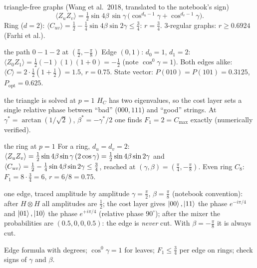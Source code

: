 \documentclass[11pt,a4paper,openany]{book}
\newcounter{wex}[chapter]
\begin{document}
\begin{keyres}{triangle-free graphs (Wang et al.\ 2018, translated to the notebook's sign)}
\[ \langle Z_uZ_v\rangle = \tfrac12\sin4\beta\,\sin\gamma\,\big(\cos^{d_u-1}\gamma + \cos^{d_v-1}\gamma\big). \]
Ring ($d = 2$): $\langle C_{uv}\rangle = \frac12 - \frac14\sin4\beta\sin2\gamma \le \frac34$: $r = \frac34$. 3-regular graphs: $r \ge 0.6924$ (Farhi et al.).
\end{keyres}
\begin{wexample}{the path $0{-}1{-}2$ at $(\frac\pi2, -\frac\pi8)$}
Edge $(0,1)$: $d_0 = 1$, $d_1 = 2$: $\langle Z_0Z_1\rangle = \frac12(-1)(1)(1 + 0) = -\frac12$ (note $\cos^0\gamma = 1$). Both edges alike:
$\langle C\rangle = 2\cdot\frac12(1 + \frac12) = 1.5$, $r = 0.75$. State vector: $P(010) = P(101) = 0.3125$, $P_{\text{opt}} = 0.625$.
\end{wexample}
\begin{wexample}{the triangle is solved at $p = 1$}
$H_C$ has two eigenvalues, so the cost layer sets a single relative phase between ``bad'' ($000, 111$) and ``good'' strings. At
$\gamma^* = \arctan(1/\sqrt2)$, $\beta^* = -\gamma^*/2$ one finds $F_1 = 2 = C_{\max}$ exactly (numerically verified).
\end{wexample}

\begin{wexample}{the ring at $p = 1$}
For a ring, $d_u = d_v = 2$: $\braket{Z_uZ_v} = \frac12\sin4\beta\sin\gamma\,(2\cos\gamma) = \frac12\sin4\beta\sin2\gamma$ and $\braket{C_{uv}} = \frac12 - \frac14\sin4\beta\sin2\gamma \le \frac34$, reached at
$(\gamma, \beta) = (\frac\pi4, -\frac\pi8)$. Even ring $C_8$: $F_1 = 8\cdot\frac34 = 6$, $r = 6/8 = 0.75$.
\end{wexample}
\begin{wexample}{one edge, traced amplitude by amplitude}
$\gamma = \frac\pi2$, $\beta = \frac\pi8$ (notebook convention): after $H\otimes H$ all amplitudes are $\frac12$; the cost layer gives $\ket{00}, \ket{11}$ the phase $e^{-i\pi/4}$ and
$\ket{01}, \ket{10}$ the phase $e^{+i\pi/4}$ (relative phase $90^\circ$); after the mixer the probabilities are $(0.5, 0, 0, 0.5)$: the edge is \emph{never} cut. With
$\beta = -\frac\pi8$ it is always cut.
\end{wexample}
\begin{checklist}
Edge formula with degrees; $\cos^0\gamma = 1$ for leaves; $F_1 \le \frac34$ per edge on rings; check signs of $\gamma$ and $\beta$.
\end{checklist}
\end{document}
